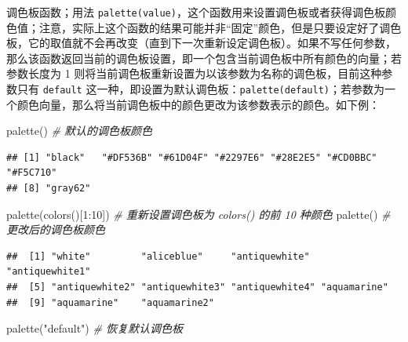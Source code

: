 \documentclass[
  b5paper,
  UTF8,twoside]{book}
\newenvironment{Shaded}{\begin{snugshade}}{\end{snugshade}}
\newcommand{\CommentTok}[1]{\textcolor[rgb]{0.56,0.35,0.01}{\textit{#1}}}
\newcommand{\DecValTok}[1]{\textcolor[rgb]{0.00,0.00,0.81}{#1}}
\newcommand{\FunctionTok}[1]{\textcolor[rgb]{0.00,0.00,0.00}{#1}}
\newcommand{\NormalTok}[1]{#1}
\newcommand{\SpecialCharTok}[1]{\textcolor[rgb]{0.00,0.00,0.00}{#1}}
\newcommand{\StringTok}[1]{\textcolor[rgb]{0.31,0.60,0.02}{#1}}
\providecommand{\tightlist}{%
  \setlength{\itemsep}{0pt}\setlength{\parskip}{0pt}}
\begin{document}
\begin{description}
\tightlist
\item[\texttt{palette()}]
调色板函数；用法 \texttt{palette(value)}，这个函数用来设置调色板或者获得调色板颜色值；注意，实际上这个函数的结果可能并非``固定''颜色，但是只要设定好了调色板，它的取值就不会再改变（直到下一次重新设定调色板）。如果不写任何参数，那么该函数返回当前的调色板设置，即一个包含当前调色板中所有颜色的向量；若参数长度为 1 则将当前调色板重新设置为以该参数为名称的调色板，目前这种参数只有 \texttt{\textquotesingle{}default\textquotesingle{}} 这一种，即设置为默认调色板：\texttt{palette(\textquotesingle{}default\textquotesingle{})}；若参数为一个颜色向量，那么将当前调色板中的颜色更改为该参数表示的颜色。如下例：
\end{description}

\begin{Shaded}
\begin{Highlighting}[]
\FunctionTok{palette}\NormalTok{() }\CommentTok{\# 默认的调色板颜色}
\end{Highlighting}
\end{Shaded}

\begin{verbatim}
## [1] "black"   "#DF536B" "#61D04F" "#2297E6" "#28E2E5" "#CD0BBC" "#F5C710"
## [8] "gray62"
\end{verbatim}

\begin{Shaded}
\begin{Highlighting}[]
\FunctionTok{palette}\NormalTok{(}\FunctionTok{colors}\NormalTok{()[}\DecValTok{1}\SpecialCharTok{:}\DecValTok{10}\NormalTok{]) }\CommentTok{\# 重新设置调色板为 colors() 的前 10 种颜色}
\FunctionTok{palette}\NormalTok{() }\CommentTok{\# 更改后的调色板颜色}
\end{Highlighting}
\end{Shaded}

\begin{verbatim}
##  [1] "white"         "aliceblue"     "antiquewhite"  "antiquewhite1"
##  [5] "antiquewhite2" "antiquewhite3" "antiquewhite4" "aquamarine"   
##  [9] "aquamarine"    "aquamarine2"
\end{verbatim}

\begin{Shaded}
\begin{Highlighting}[]
\FunctionTok{palette}\NormalTok{(}\StringTok{"default"}\NormalTok{) }\CommentTok{\# 恢复默认调色板}
\end{Highlighting}
\end{Shaded}
\end{document}
